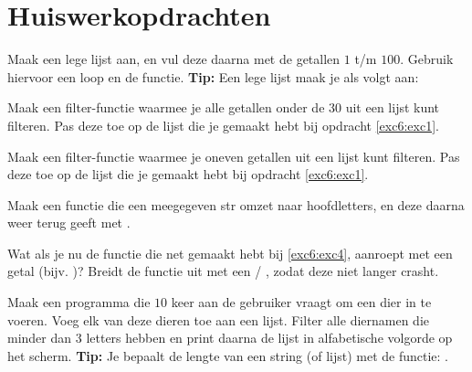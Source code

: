 \newpage

\section{Huiswerkopdrachten}

\begin{exercise}\label{exc6:exc1}
Maak een lege lijst aan, en vul deze daarna met de getallen $1$ t/m $100$.
Gebruik hiervoor een loop en de  functie. \newline
\textbf{Tip:} Een lege lijst maak je als volgt aan: 
\end{exercise}

\begin{exercise}
Maak een filter-functie waarmee je alle getallen onder de $30$ uit een lijst kunt filteren. Pas deze toe op de lijst die je gemaakt hebt bij opdracht \ref{exc6:exc1}.
\end{exercise}

\begin{exercise}
Maak een filter-functie waarmee je oneven getallen uit een lijst kunt filteren. Pas deze toe op de lijst die je gemaakt hebt bij opdracht \ref{exc6:exc1}.
\end{exercise}

\begin{exercise}
\label{exc6:exc4}
Maak een functie  die een meegegeven str omzet naar hoofdletters, en deze daarna weer terug geeft met . 
\end{exercise}

\begin{exercise}
Wat als je nu de functie die net gemaakt hebt bij \ref{exc6:exc4}, aanroept met een getal (bijv. )? \newline
Breidt de functie uit met een  / , zodat deze niet langer crasht. 
\end{exercise}

\begin{exercise}
Maak een programma die $10$ keer aan de gebruiker vraagt om een dier in te voeren. Voeg elk van deze dieren toe aan een lijst. Filter alle diernamen die minder dan $3$ letters hebben en print daarna de lijst in alfabetische volgorde op het scherm. \newline
\textbf{Tip:} Je bepaalt de lengte van een string (of lijst) met de functie: .
\end{exercise}
